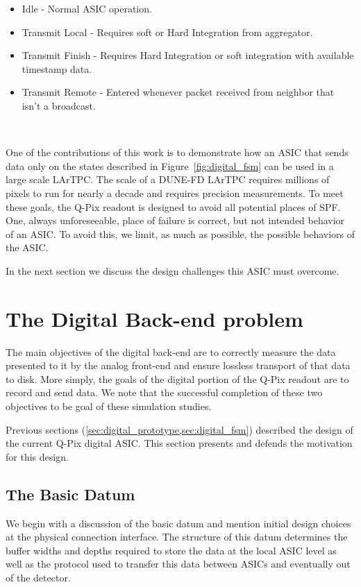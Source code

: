\begin{itemize}
    \item Idle - Normal ASIC operation.
    \item Transmit Local - Requires soft or Hard Integration from aggregator.
    \item Transmit Finish - Requires Hard Integration or soft integration with available timestamp data.
    \item Transmit Remote - Entered whenever packet received from neighbor that isn't a broadcast.
\end{itemize}~\label{fsm_state_labels}

One of the contributions of this work is to demonstrate how an ASIC that sends data only on the states described in Figure~\ref{fig:digital_fsm} can be used in a large scale LArTPC.
The scale of a DUNE-FD LArTPC requires millions of pixels to run for nearly a decade and requires precision measurements.
To meet these goals, the Q-Pix readout is designed to avoid all potential places of SPF.
One, always unforeseeable, place of failure is correct, but not intended behavior of an ASIC.
To avoid this, we limit, as much as possible, the possible behaviors of the ASIC.

In the next section we discuss the design challenges this ASIC must overcome.

\section{The Digital Back-end problem}\label{sec:digital_problem}
The main objectives of the digital back-end are to correctly measure the data presented to it by the analog front-end and ensure lossless transport of that data to disk.
More simply, the goals of the digital portion of the Q-Pix readout are to record and send data.
We note that the successful completion of these two objectives to be goal of these simulation studies.

Previous sections (\cref{sec:digital_prototype,sec:digital_fsm}) described the design of the current Q-Pix digital ASIC.
This section presents and defends the motivation for this design.

\subsection{The Basic Datum}
We begin with a discussion of the basic datum and mention initial design choices at the physical connection interface.
The structure of this datum determines the buffer widths and depths required to store the data at the local ASIC level as well as the protocol used to transfer this data between ASICs and eventually out of the detector.

